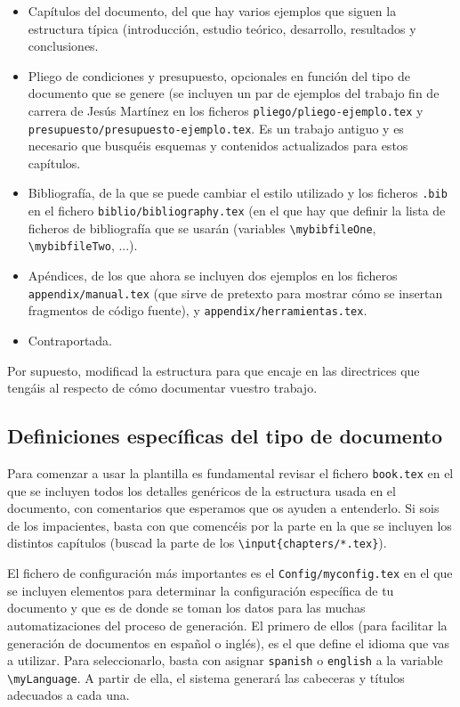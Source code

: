 \documentclass[spanish,openright]{book}
\begin{document}
\begin{itemize}
\item Capítulos del documento, del que hay varios ejemplos que siguen la
estructura típica (introducción, estudio teórico, desarrollo,
resultados y conclusiones.

\item Pliego de condiciones y presupuesto, opcionales en función del
tipo de documento que se genere (se incluyen un
par de ejemplos del trabajo fin de carrera de Jesús Martínez en los
ficheros \texttt{pliego/pliego-ejemplo.tex} y
\texttt{presupuesto/presupuesto-ejemplo.tex}. Es un trabajo antiguo y
es necesario que busquéis esquemas y contenidos actualizados para
estos capítulos.

\item Bibliografía, de la que se puede cambiar el estilo utilizado y los
ficheros \texttt{.bib} en el fichero
\texttt{biblio/bibliography.tex} (en el que hay que definir la lista
de ficheros de bibliografía que se usarán (variables
\texttt{\textbackslash{}mybibfileOne},
\texttt{\textbackslash{}mybibfileTwo}, ...).

\item Apéndices, de los que ahora se incluyen dos ejemplos en los
ficheros \texttt{appendix/manual.tex} (que sirve de pretexto para
mostrar cómo se insertan fragmentos de código fuente), y
\texttt{appendix/herramientas.tex}.
\item Contraportada.
\end{itemize}

Por supuesto, modificad la estructura para que encaje en las directrices
que tengáis al respecto de cómo documentar vuestro trabajo.


\subsection{Definiciones específicas del tipo de documento}
\label{sec:definicion-del-tipo}

Para comenzar a usar la plantilla es fundamental revisar el fichero
\texttt{book.tex} en el que se incluyen todos los detalles genéricos de
la estructura usada en el documento, con comentarios que esperamos que
os ayuden a entenderlo. Si sois de los impacientes, basta con que
comencéis por la parte en la que se incluyen los distintos capítulos
(buscad la parte de los \texttt{\textbackslash{}input\{chapters/*.tex\}}).

El fichero de configuración más importantes es el
\texttt{Config/myconfig.tex} en el que se incluyen elementos para
determinar la configuración específica de tu documento y que es de
donde se toman los datos para las muchas automatizaciones del proceso
de generación. El primero de ellos (para facilitar la generación de
documentos en español o inglés), es el que define el idioma que vas a
utilizar. Para seleccionarlo, basta con asignar \texttt{spanish} o
\texttt{english} a la variable \texttt{\textbackslash{}myLanguage}. A
partir de ella, el sistema generará las cabeceras y títulos adecuados
a cada una.
\end{document}
